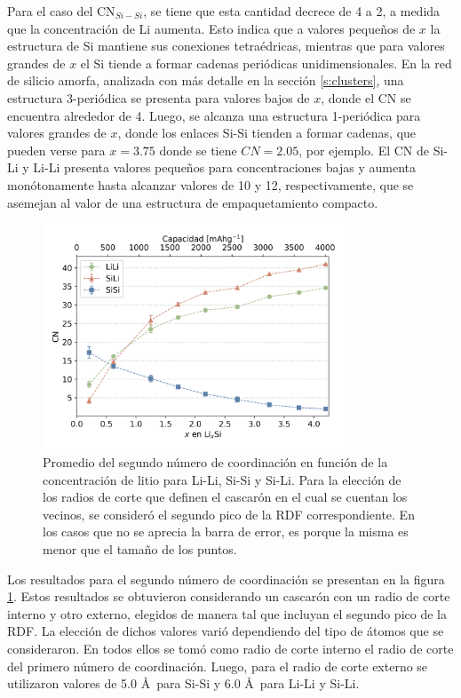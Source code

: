 Para el caso del CN$_{Si-Si}$, se tiene que esta cantidad decrece de 4 a 2, a 
medida que la concentración de Li aumenta. Esto indica que a valores pequeños de 
$x$ la estructura de Si mantiene sus conexiones tetraédricas, mientras que para
valores grandes de $x$ el Si tiende a formar cadenas periódicas unidimensionales.
En la red de silicio amorfa, analizada con más detalle en la sección 
\ref{s:clusters}, una estructura 3-periódica se presenta para valores bajos de 
$x$, donde el CN se encuentra alrededor de 4. Luego, se alcanza una estructura 1-periódica 
para valores grandes de $x$, donde los enlaces Si-Si tienden a formar 
cadenas, que pueden verse para $x = 3.75$ donde se tiene $CN = 2.05$, por ejemplo.
El CN de Si-Li y Li-Li presenta valores pequeños para concentraciones 
bajas y aumenta monótonamente hasta alcanzar valores de 10 y 12, respectivamente, 
que se asemejan al valor de una estructura de empaquetamiento compacto.

\begin{figure}[th]
    \centering
    \includegraphics[width=0.8\textwidth]{caracterizacion/resultados/cn/cn2.png}
    \caption{Promedio del segundo número de coordinación en función de la 
    concentración de litio para Li-Li, Si-Si y Si-Li. Para la elección de los 
    radios de corte que definen el cascarón en el cual se cuentan los vecinos,
    se consideró el segundo pico de la RDF correspondiente. En los casos que no 
    se aprecia la barra de error, es porque la misma es menor que el tamaño de 
    los puntos.}
    \label{fig:cn2}
\end{figure}
Los resultados para el segundo número de coordinación se presentan en la figura 
\ref{fig:cn2}. Estos resultados se obtuvieron considerando un cascarón con un 
radio de corte interno y otro externo, elegidos de manera tal que incluyan el 
segundo pico de la RDF. La elección de dichos valores varió dependiendo del tipo
de átomos que se consideraron. En todos ellos se tomó como radio de corte interno 
el radio de corte del primero número de coordinación. Luego, para el radio de 
corte externo se utilizaron valores de 5.0 \AA\ para Si-Si y 6.0 \AA\ para Li-Li
y Si-Li.

